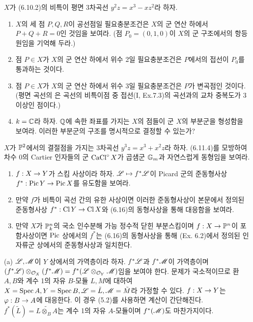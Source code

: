 \begin{enumerate}[label=\tb{6.\arabic*.},itemindent=0mm,itemsep=4mm]
{\begin{enumerate}[label=(\alph*)]
	\end{enumerate}}
	\item $X$가 (6.10.2)의 비특이 평면 3차곡선 $y^2z=x^3-xz^2$라 하자.
	\begin{enumerate}[label=(\alph*)]
	\item $X$의 세 점 $P,Q,R$이 공선점일 필요충분조건은 $X$의 군 연산 하에서 $P+Q+R=0$인 것임을 보여라.
	(점 $P_0=(0,1,0)$이 $X$의 군 구조에서의 항등원임을 기억해 두라.)
	\item 점 $P\in X$가 $X$의 군 연산 하에서 위수 2일 필요충분조건은 $P$에서의 접선이 $P_0$를 통과하는 것이다.
	\item 점 $P\in X$가 $X$의 군 연산 하에서 위수 3일 필요충분조건은 $P$가 변곡점인 것이다.
	(평면 곡선의 은 곡선의 비특이점 중 접선(I, Ex.7.3)의 곡선과의 교차 중복도가 3 이상인 점이다.)
	\item $k=\mathbb C$라 하자. $\mathbb Q$에 속한 좌표를 가지는 $X$의 점들이 군 $X$의 부분군을 형성함을 보여라.
	이러한 부분군의 구조를 명시적으로 결정할 수 있는가?
	\end{enumerate}
	{\renewcommand{\labelenumi}{\tb{*6.\arabic{enumi}.}}
	\item $X$가 $\mathbb{P}^2$에서의 결절점을 가지는 3차곡선 $y^3z=x^3+x^2z$라 하자.
	(6.11.4)를 모방하여 차수 0의 Cartier 인자들의 군 $\operatorname{CaCl}^\circ X$가 곱샘군 $\mathbb{G}_m$과 자연스럽게 동형임을 보여라.}
	\item \begin{enumerate}[label=(\alph*)]
	\item $f:X\rightarrow Y$가 스킴 사상이라 하자. $\mathscr{L}\mapsto f^*\mathscr{L}$이 Picard 군의 준동형사상 $f^*:\operatorname{Pic} Y\rightarrow\operatorname{Pic} X$를 유도함을 보여라.
	\item 만약 $f$가 비특이 곡선 간의 유한 사상이면 이러한 준동형사상이 본문에서 정의된 준동형사상 $f^*:\operatorname{Cl} Y\rightarrow\operatorname{Cl} X$와
	(6.16)의 동형사상을 통해 대응함을 보여라.
	\item 만약 $X$가 $\mathbb{P}^n_k$의 국소 인수분해 가능 정수적 닫힌 부분스킴이며 $f:X\rightarrow\mathbb{P}^n$이 포함사상이면
	$\mathrm{Pic}$ 상에서의 $f^*$는 (6.16)의 동형사상을 통해 (Ex. 6.2)에서 정의된 인자류군 상에서의 준동형사상과 일치한다.
	\end{enumerate}
	\sol (a) $\mathscr{L},\mathscr{M}$이 $Y$ 상에서의 가역층이라 하자. $f^*\mathscr{L}$과 $f^*\mathscr{M}$이 가역층이며
	$(f^*\mathscr{L})\otimes_{\mathcal{O}_X}(f^*\mathscr{M})=f^*(\mathscr{L}\otimes_{\mathcal{O}_Y}\mathscr{M})$임을 보여야 한다.
	문제가 국소적이므로 환 $A,B$와 계수 1의 자유 $B$-모듈 $L,M$에 대하여
	$X=\operatorname{Spec} A,Y=\operatorname{Spec} B,\mathscr{L}=\tilde L,\mathscr{M}=\tilde M$라 가정할 수 있다. $f:X\rightarrow Y$는 $\varphi:B\rightarrow A$에 대응한다.
	이 경우 (5.2)를 사용하면 계산이 간단해진다.
	$f^*(\tilde L)=\tilde{L\otimes_BA}$는 계수 1의 자유 $A$-모듈이며 $f^*(\mathscr{M})$도 마찬가지이다.

\end{enumerate}
